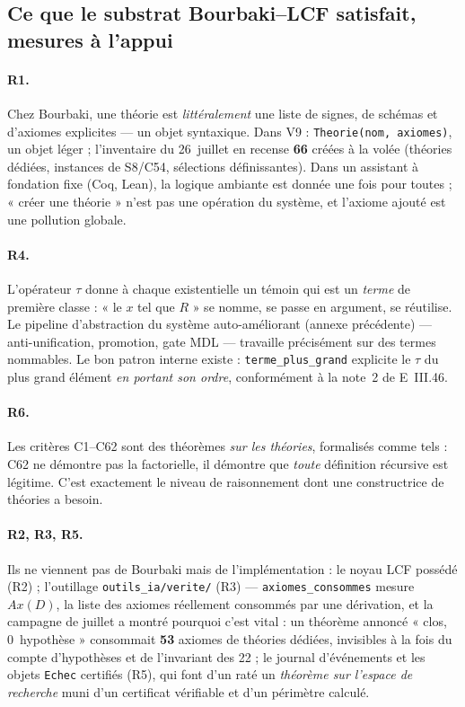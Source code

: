 \subsection{Ce que le substrat Bourbaki--LCF satisfait, mesures à l'appui}

\paragraph{R1.} Chez Bourbaki, une théorie est \emph{littéralement} une liste de
signes, de schémas et d'axiomes explicites --- un objet syntaxique. Dans V9 :
\texttt{Theorie(nom, axiomes)}, un objet léger ; l'inventaire du 26~juillet en
recense \textbf{66} créées à la volée (théories dédiées, instances de S8/C54,
sélections définissantes). Dans un assistant à fondation fixe (Coq, Lean), la
logique ambiante est donnée une fois pour toutes ; « créer une théorie » n'est
pas une opération du système, et l'axiome ajouté est une pollution globale.

\paragraph{R4.} L'opérateur $\tau$ donne à chaque existentielle un témoin qui
est un \emph{terme} de première classe : « le $x$ tel que $R$ » se nomme, se
passe en argument, se réutilise. Le pipeline d'abstraction du système
auto-améliorant (annexe précédente) --- anti-unification, promotion, gate MDL
--- travaille précisément sur des termes nommables. Le bon patron interne
existe : \texttt{terme\_plus\_grand} explicite le $\tau$ du plus grand élément
\emph{en portant son ordre}, conformément à la note~2 de E~III.46.

\paragraph{R6.} Les critères C1--C62 sont des théorèmes \emph{sur les théories},
formalisés comme tels : C62 ne démontre pas la factorielle, il démontre que
\emph{toute} définition récursive est légitime. C'est exactement le niveau de
raisonnement dont une constructrice de théories a besoin.

\paragraph{R2, R3, R5.} Ils ne viennent pas de Bourbaki mais de l'implémentation :
le noyau LCF possédé (R2) ; l'outillage \texttt{outils\_ia/verite/} (R3) ---
\texttt{axiomes\_consommes} mesure $Ax(D)$, la liste des axiomes réellement
consommés par une dérivation, et la campagne de juillet a montré pourquoi c'est
vital : un théorème annoncé « clos, 0~hypothèse » consommait \textbf{53} axiomes
de théories dédiées, invisibles à la fois du compte d'hypothèses et de
l'invariant des 22 ; le journal d'événements et les objets \texttt{Echec}
certifiés (R5), qui font d'un raté un \emph{théorème sur l'espace de recherche}
muni d'un certificat vérifiable et d'un périmètre calculé.

